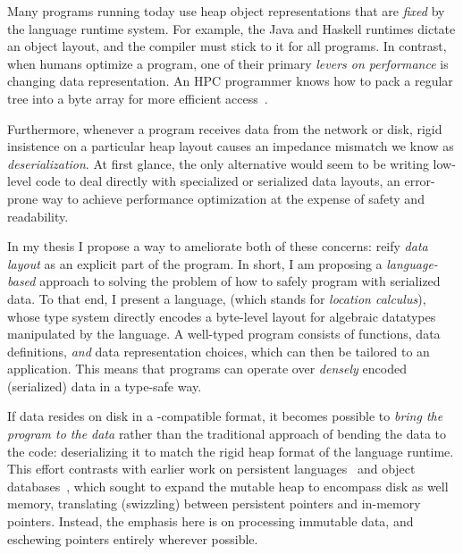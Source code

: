 Many programs running today use heap object representations that are \emph{fixed}
by the language runtime system.
For example, the Java and Haskell runtimes dictate an object layout, and the
compiler must stick to it for all programs.
%
In contrast, when humans optimize a program, one of their primary {\em levers on
performance} is changing data representation.  An HPC programmer
knows how to pack a regular tree into a byte array for more efficient
access~\cite{makino90,goldfarb13sc,Meyerovich2011}.

Furthermore, whenever a program receives data from the network or
disk, rigid insistence on a particular heap layout causes an impedance mismatch
we know as {\em deserialization}.
%
%
At first glance, the only alternative would seem to be writing low-level code to
deal directly with specialized or serialized data layouts, an error-prone way to
achieve performance optimization at the expense of safety and readability.

In my thesis I propose a way to ameliorate both of these concerns: reify
\emph{data layout} as an explicit part of the program. In short, I am proposing
a \emph{language-based} approach to solving the problem of how to safely program
with serialized data. To that end,
I present a language,
\ourcalc{} (which stands for \emph{location calculus}), whose type system directly
encodes a byte-level layout for algebraic datatypes manipulated by the language.
%
A well-typed program consists of functions, data definitions, \emph{and}
data representation choices, which
can then be tailored to an application.
%
This means that programs can operate over {\em densely}
encoded (serialized) data in a type-safe way.
%

{If data resides on disk in a \ourcalc-compatible format}, it becomes
possible to {\em bring the program to the data} rather than the traditional
approach of bending the data to the code: deserializing it to match the rigid
heap format of the language runtime.
{This effort contrasts with earlier work on persistent
languages~\cite{persistent-java,persistent-objects-thor} and object databases~\cite{object-fault-handling},
which sought to expand the mutable heap to encompass disk as well memory,
translating (swizzling) between persistent pointers and in-memory pointers.  Instead, the
emphasis here is on processing immutable data, and eschewing pointers entirely
wherever possible.}

